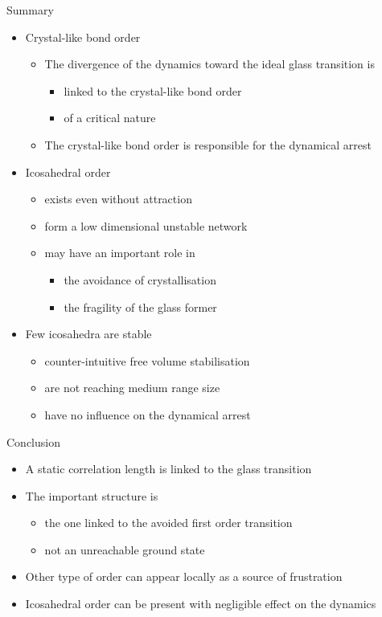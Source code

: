\begin{frame}{Summary}
	\begin{itemize}
		\item Crystal-like bond order
		\begin{itemize}
			\item The divergence of the dynamics toward the ideal glass transition is 
			\begin{itemize}
				\item linked to the crystal-like bond order
				\item of a critical nature
			\end{itemize}
			\item The crystal-like bond order is responsible for the dynamical arrest
		\end{itemize}
		
		\item Icosahedral order 
		\begin{itemize}
			\item exists even without attraction
			\item form a low dimensional \alert{unstable} network
			\item may have an important role in
			\begin{itemize}
				\item the avoidance of crystallisation
				\item the fragility of the glass former
			\end{itemize}
		\end{itemize}
		\item Few icosahedra are stable
		\begin{itemize}
			\item counter-intuitive free volume stabilisation
			\item are not reaching medium range size
			\item have no influence on the dynamical arrest
		\end{itemize}
	\end{itemize}
\end{frame}

\begin{frame}{Conclusion}
	\begin{itemize}
		\item A static correlation length is linked to the glass transition
		\item The important structure is
		\begin{itemize}
			\item the one linked to the avoided first order transition
			\item not an unreachable ground state
		\end{itemize}
		\item Other type of order can appear locally as a source of frustration
		\item Icosahedral order can be present with negligible effect on the dynamics
	\end{itemize}
\end{frame}